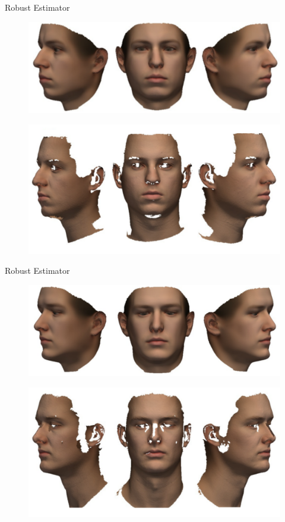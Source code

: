 \documentclass[xcolor=x11names,compress]{beamer}
\begin{document}
\begin{frame}{Robust Estimator}
    \begin{figure}
        \centering
        \includegraphics[width=.8\textwidth]{../resources/img/00303_fit.pdf}
    \end{figure}
    \begin{figure}
        \centering
        \includegraphics[width=.8\textwidth]{../resources/img/00303_textured_target.pdf}
    \end{figure}
\end{frame}

\begin{frame}{Robust Estimator}
    \begin{figure}
        \centering
        \includegraphics[width=.8\textwidth]{../resources/img/00029_fit.pdf}
    \end{figure}
    \begin{figure}
        \centering
        \includegraphics[width=.8\textwidth]{../resources/img/00029_textured_target.pdf}
    \end{figure}
\end{frame}
\end{document}
